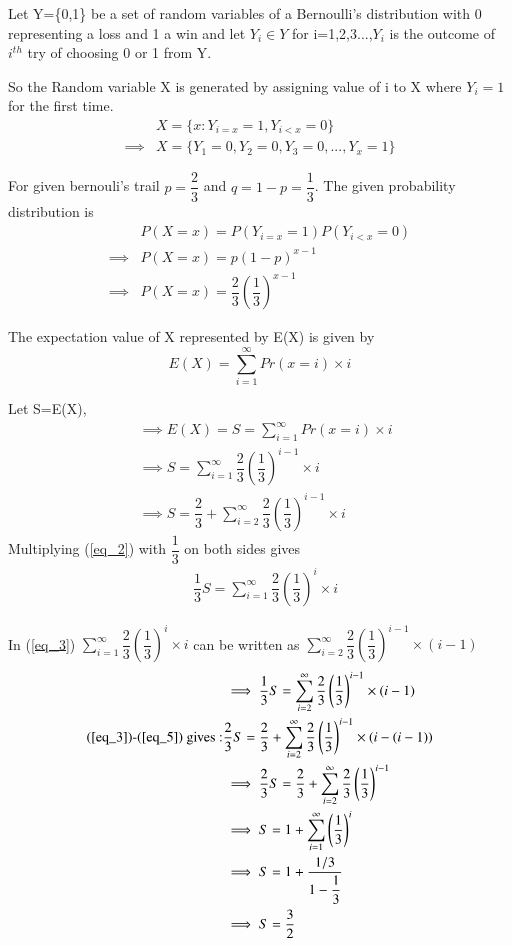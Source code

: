 Let Y=\{0,1\} be a set of random variables of a Bernoulli's distribution with 0 representing a loss and 1 a win and let $Y_i \in Y$ for i=1,2,3...,$Y_i$ is the outcome of $i^{th}$ try of choosing 0 or 1 from Y.

 So the Random variable X is generated by assigning value of i to X where $Y_i=1$ for the first time.
\begin{align*}
&X=\{x:Y_{i=x}=1,Y_{i<x}=0\} \\
\implies & X=\{Y_1=0,Y_2=0,Y_3=0,...,Y_x=1\}
\end{align*}


For given bernouli's trail $p=\dfrac{2}{3}$ and $q=1-p=\dfrac{1}{3}$. The given probability distribution is 
\begin{align*}
&P(X=x)=P(Y_{i=x}=1)P(Y_{i<x}=0)\\
\implies &P(X=x)=p(1-p)^{x-1}\\
\implies &P(X=x)=\dfrac{2}{3}\left(\dfrac{1}{3}\right)^{x-1}
\end{align*}

The expectation value of X represented by E(X) is given by
$$E(X)=\sum_{i=1}^{\infty} Pr(x=i)\times i$$

Let S=E(X),
\begin{align}
&\implies E(X)=S=\sum_{i=1}^{\infty} Pr(x=i)\times i\\
&\implies S=\sum_{i=1}^{\infty} \dfrac{2}{3}\left(\dfrac{1}{3}\right)^{i-1} \times i \label{eq_2}   \\
&\implies S=\dfrac{2}{3}+\sum_{i=2}^{\infty} \dfrac{2}{3}\left(\dfrac{1}{3}\right)^{i-1} \times i  \label{eq_3}
\end{align}
Multiplying (\ref{eq_2}) with  $\dfrac{1}{3}$ on both sides gives
\begin{align}
&\dfrac{1}{3}S=\sum_{i=1}^{\infty} \dfrac{2}{3}\left(\dfrac{1}{3}\right)^{i} \times i \label{eq_4}
\end{align}

In (\ref{eq_3})	$\sum_{i=1}^{\infty} \dfrac{2}{3}\left(\dfrac{1}{3}\right)^{i} \times i$ can be written as $\sum_{i=2}^{\infty} \dfrac{2}{3}\left(\dfrac{1}{3}\right)^{i-1} \times (i-1)$
\begin{align}
& \implies \dfrac{1}{3}S=\sum_{i=2}^{\infty} \dfrac{2}{3}\left(\dfrac{1}{3}\right)^{i-1} \times (i-1) \label{eq_5} \\
\text{(\ref{eq_3})-(\ref{eq_5}) gives :}& \dfrac{2}{3}S=\dfrac{2}{3}+\sum_{i=2}^{\infty} \dfrac{2}{3}\left(\dfrac{1}{3}\right)^{i-1} \times (i-(i-1))\\
&\implies  \dfrac{2}{3}S=\dfrac{2}{3}+\sum_{i=2}^{\infty} \dfrac{2}{3}\left(\dfrac{1}{3}\right)^{i-1}\\
& \implies S=1+\sum_{i=1}^{\infty}\left(\dfrac{1}{3}\right)^{i}\\
& \implies S=1+\dfrac{1/3}{1-\dfrac{1}{3}}\\
& \implies S=\dfrac{3}{2} \label{eq_10}
\end{align}

